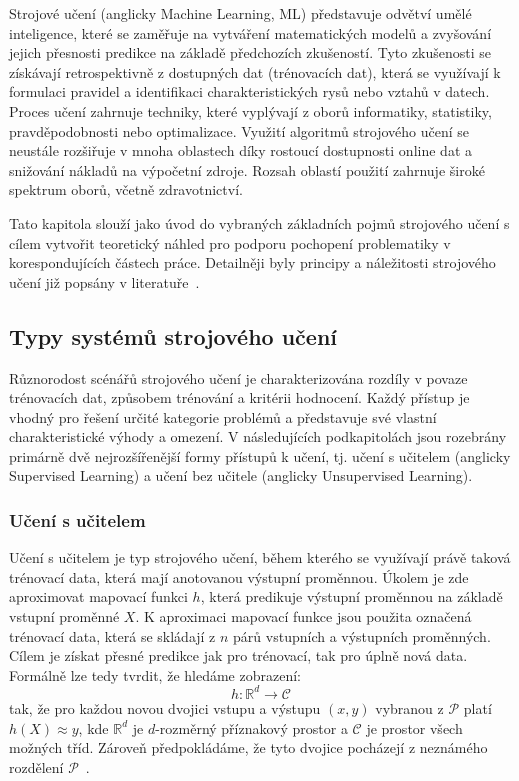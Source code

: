 Strojové učení (anglicky Machine Learning, \gls{ML}) představuje odvětví umělé
inteligence, které se zaměřuje na vytváření matematických modelů a zvyšování
jejich přesnosti predikce na základě předchozích zkušeností. Tyto zkušenosti se
získávají retrospektivně z dostupných dat (trénovacích dat), která se využívají
k formulaci pravidel a identifikaci charakteristických rysů nebo vztahů v
datech. Proces učení zahrnuje techniky, které vyplývají z  oborů informatiky,
statistiky, pravděpodobnosti nebo optimalizace. Využití algoritmů strojového
učení se neustále rozšiřuje v mnoha oblastech díky rostoucí dostupnosti online
dat a snižování nákladů na výpočetní zdroje. Rozsah oblastí použití zahrnuje
široké spektrum oborů, včetně zdravotnictví.

Tato kapitola slouží jako úvod do vybraných základních pojmů strojového učení s
cílem vytvořit teoretický náhled pro podporu pochopení problematiky v
korespondujících částech práce. Detailněji byly principy a náležitosti
strojového učení již popsány v
literatuře~\cite{Aurelien2022,Murphy2012,Goodfellow2016}.

\subsection{Typy systémů strojového učení}
Různorodost scénářů strojového učení je charakterizována rozdíly v povaze
trénovacích dat, způsobem trénování a kritérii hodnocení. Každý přístup je
vhodný pro řešení určité kategorie problémů a představuje své vlastní
charakteristické výhody a omezení. V následujících podkapitolách jsou rozebrány
primárně dvě nejrozšířenější formy přístupů k učení, tj. učení s učitelem
(anglicky Supervised Learning) a učení bez učitele (anglicky Unsupervised
Learning).

\subsubsection{Učení s učitelem}
\label{subsubsec:supervised_learning}
Učení s učitelem je typ strojového učení, během kterého se využívají právě
taková trénovací data, která mají anotovanou výstupní proměnnou. Úkolem je zde
aproximovat mapovací funkci $h$, která predikuje výstupní proměnnou na základě
vstupní proměnné $X$. K aproximaci mapovací funkce jsou použita označená
trénovací data, která se skládají z $n$ párů vstupních a výstupních proměnných.
Cílem je získat přesné predikce jak pro trénovací, tak pro úplně nová data.
Formálně lze tedy tvrdit, že hledáme zobrazení:
\begin{equation}
    h:\mathbb{R}^d \rightarrow \mathcal{C}
\end{equation}
tak, že pro každou novou dvojici vstupu a výstupu $(x,y)$ vybranou z
$\mathcal{P}$ platí $h(X) ≈ y$, kde $\mathbb{R}^d$ je $d$-rozměrný příznakový
prostor a $\mathcal{C}$ je prostor všech možných tříd. Zároveň předpokládáme, že
tyto dvojice pocházejí z neznámého rozdělení $\mathcal{P}$~\cite{Murphy2012}.

